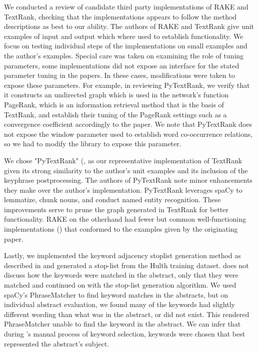 \documentclass[11pt,a4paper]{article}
\begin{document}
We conducted a review of candidate third party implementations of RAKE and TextRank, checking that the implementations appears to follow the method descriptions as best to our ability. The authors of RAKE and TextRank give unit examples of input and output which where used to establish functionality. We focus on testing individual steps of the implementations on small examples and the author's examples. Special care was taken on examining the role of tuning parameters, some implementations did not expose an interface for the stated parameter tuning in the papers. In these cases, modifications were taken to expose these parameters. For example, in reviewing PyTextRank, we verify that it constructs an undirected graph which is used in the network's function PageRank, which is an information retrieval method that is the basis of TextRank, and establish their tuning of the PageRank settings such as a convergence coefficient accordingly to the paper. We note that PyTextRank does not expose the window parameter used to establish word co-occurrence relations, so we had to modify the library to expose this parameter.

We chose "PyTextRank" (\citet{PyTextRank}, as our representative implementation of TextRank given its strong similarity to the author's unit examples and its inclusion of the keyphrase postprocessing. The authors of PyTextRank note minor enhancements they make over the author's implementation. PyTextRank leverages spaCy to lemmatize, chunk nouns, and conduct named entity recognition. These improvements serve to prune the graph generated in TextRank for better functionality. RAKE on the otherhand had fewer but common well-functioning implementations (\citet{2}) that conformed to the examples given by the originating paper. 

Lastly, we implemented the keyword adjacency stoplist generation method as described in \citet{1} and generated a stop-list from the Hulth training dataset. \citet{1} does not discuss how the keywords were matched in the abstract, only that they were matched and continued on with the stop-list generation algorithm. We used spaCy's PhraseMatcher to find keyword matches in the abstracts, but on individual abstract evaluation, we found many of the keywords had slightly different wording than what was in the abstract, or did not exist. This rendered PhraseMatcher unable to find the keyword in the abstract. We can infer that during \citet{hulth-2003-improved}'s manual process of keyword selection, keywords were chosen that best represented the abstract's subject.
\end{document}
